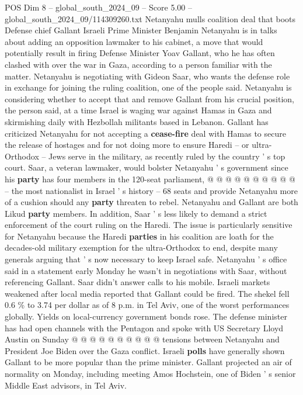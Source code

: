 \begin{textsample}{POS Dim 8 – global\_south\_2024\_09 – Score 5.00 – global\_south\_2024\_09/114309260.txt}  \label{ex:f8_pos_255}
Netanyahu mulls coalition deal that boots Defense chief Gallant Israeli Prime Minister Benjamin Netanyahu is in talks about adding an opposition lawmaker to his cabinet, a move that would potentially result in firing Defense Minister Yoav Gallant, who he has often clashed with over the war in Gaza, according to a person familiar with the matter.
Netanyahu is negotiating with Gideon Saar, who wants the defense role in exchange for joining the ruling coalition, one of the people said.
Netanyahu is considering whether to accept that and remove Gallant from his crucial position, the person said, at a time Israel is waging war against Hamas in Gaza and skirmishing daily with Hezbollah militants based in Lebanon.
Gallant has criticized Netanyahu for not accepting a \textbf{cease-fire} deal with Hamas to secure the release of hostages and for not doing more to ensure Haredi -- or ultra-Orthodox -- Jews serve in the military, as recently ruled by the country ' s top court.
Saar, a veteran lawmaker, would bolster Netanyahu ' s government since his \textbf{party} has four members in the 120-seat parliament, @ @ @ @ @ @ @ @ @ @ -- the most nationalist in Israel ' s history -- 68 seats and provide Netanyahu more of a cushion should any \textbf{party} threaten to rebel.
Netanyahu and Gallant are both Likud \textbf{party} members.
In addition, Saar ' s less likely to demand a strict enforcement of the court ruling on the Haredi.
The issue is particularly sensitive for Netanyahu because the Haredi \textbf{parties} in his coalition are loath for the decades-old military exemption for the ultra-Orthodox to end, despite many generals arguing that ' s now necessary to keep Israel safe.
Netanyahu ' s office said in a statement early Monday he wasn't in negotiations with Saar, without referencing Gallant.
Saar didn't answer calls to his mobile.
Israeli markets weakened after local media reported that Gallant could be fired.
The shekel fell 0.6 \% to 3.74 per dollar as of 8 p.m. in Tel Aviv, one of the worst performances globally.
Yields on local-currency government bonds rose.
The defense minister has had open channels with the Pentagon and spoke with US Secretary Lloyd Austin on Sunday @ @ @ @ @ @ @ @ @ @ tensions between Netanyahu and President Joe Biden over the Gaza conflict.
Israeli \textbf{polls} have generally shown Gallant to be more popular than the prime minister.
Gallant projected an air of normality on Monday, including meeting Amos Hochstein, one of Biden ' s senior Middle East advisors, in Tel Aviv.

\end{textsample}
